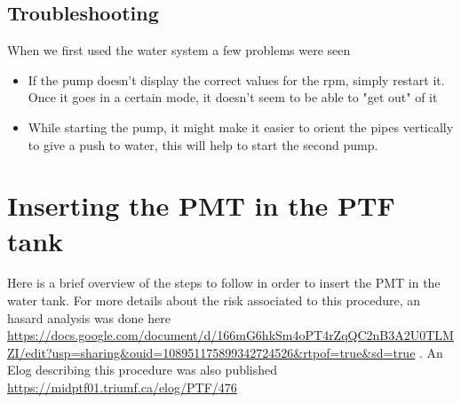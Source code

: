 \documentclass[twoside,letterpaper]{refart}
\begin{document}
\subsection{Troubleshooting}
When we first used the water system a few problems were seen
\begin{itemize}
    \item If the pump doesn't display the correct values for the rpm, simply restart it. Once it goes in a certain mode, it doesn't seem to be able to "get out" of it 
    \item While starting the pump, it might make it easier to orient the pipes vertically to give a push to water, this will help to start the second pump.
\end{itemize}


\section{Inserting the PMT in the PTF tank}
Here is a brief overview of the steps to follow in order to insert the PMT in the water tank. For more details about the risk associated to this procedure, an hasard analysis was done here \url{https://docs.google.com/document/d/166mG6hkSm4oPT4rZqQC2nB3A2U0TLMZI/edit?usp=sharing&ouid=108951175899342724526&rtpof=true&sd=true} . An Elog describing  this procedure was also published \url{https://midptf01.triumf.ca/elog/PTF/476}\\ 
\end{document}
